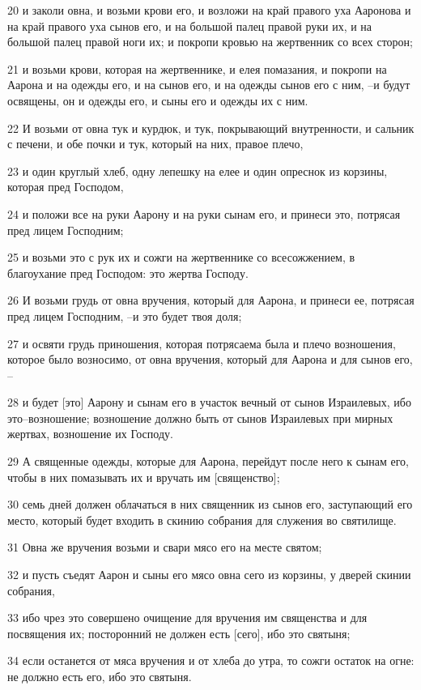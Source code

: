 \par 20 и заколи овна, и возьми крови его, и возложи на край правого уха Ааронова и на край правого уха сынов его, и на большой палец правой руки их, и на большой палец правой ноги их; и покропи кровью на жертвенник со всех сторон;
\par 21 и возьми крови, которая на жертвеннике, и елея помазания, и покропи на Аарона и на одежды его, и на сынов его, и на одежды сынов его с ним, --и будут освящены, он и одежды его, и сыны его и одежды их с ним.
\par 22 И возьми от овна тук и курдюк, и тук, покрывающий внутренности, и сальник с печени, и обе почки и тук, который на них, правое плечо,
\par 23 и один круглый хлеб, одну лепешку на елее и один опреснок из корзины, которая пред Господом,
\par 24 и положи все на руки Аарону и на руки сынам его, и принеси это, потрясая пред лицем Господним;
\par 25 и возьми это с рук их и сожги на жертвеннике со всесожжением, в благоухание пред Господом: это жертва Господу.
\par 26 И возьми грудь от овна вручения, который для Аарона, и принеси ее, потрясая пред лицем Господним, --и это будет твоя доля;
\par 27 и освяти грудь приношения, которая потрясаема была и плечо возношения, которое было возносимо, от овна вручения, который для Аарона и для сынов его, --
\par 28 и будет [это] Аарону и сынам его в участок вечный от сынов Израилевых, ибо это--возношение; возношение должно быть от сынов Израилевых при мирных жертвах, возношение их Господу.
\par 29 А священные одежды, которые для Аарона, перейдут после него к сынам его, чтобы в них помазывать их и вручать им [священство];
\par 30 семь дней должен облачаться в них священник из сынов его, заступающий его место, который будет входить в скинию собрания для служения во святилище.
\par 31 Овна же вручения возьми и свари мясо его на месте святом;
\par 32 и пусть съедят Аарон и сыны его мясо овна сего из корзины, у дверей скинии собрания,
\par 33 ибо чрез это совершено очищение для вручения им священства и для посвящения их; посторонний не должен есть [сего], ибо это святыня;
\par 34 если останется от мяса вручения и от хлеба до утра, то сожги остаток на огне: не должно есть его, ибо это святыня.
